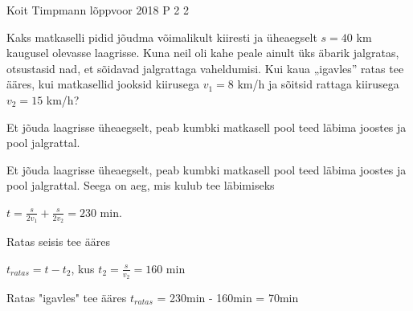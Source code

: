 {Koit Timpmann} %
{lõppvoor} %
{2018} %
{P 2} %
{2} %
{

\ifStatement
Kaks matkaselli pidid jõudma võimalikult kiiresti ja üheaegselt $s = 40$ km kaugusel olevasse laagrisse. Kuna neil oli kahe peale ainult üks äbarik jalgratas, otsustasid nad, et sõidavad jalgrattaga vaheldumisi. Kui kaua „igavles” ratas tee ääres, kui matkasellid jooksid kiirusega $v_1 = 8$ km/h ja sõitsid rattaga kiirusega $v_2 = 15$ km/h?
\fi


\ifHint
Et jõuda laagrisse üheaegselt, peab kumbki matkasell pool teed läbima joostes ja pool jalgrattal.
\fi

\ifSolution
Et jõuda laagrisse üheaegselt, peab kumbki matkasell pool teed läbima joostes ja pool jalgrattal. Seega on aeg, mis kulub tee läbimiseks 
\begin{center}
$t = \frac{s}{2v_1} + \frac{s}{2v_2} = 230$ min.
\end{center}
Ratas seisis tee ääres
\begin{center}
$t_{ratas} = t - t_2$, kus $t_2 = \frac{s}{v_2} = 160$ min
\end{center}
Ratas "igavles" tee ääres $t_{ratas}$ = 230min - 160min = 70min
\fi
}